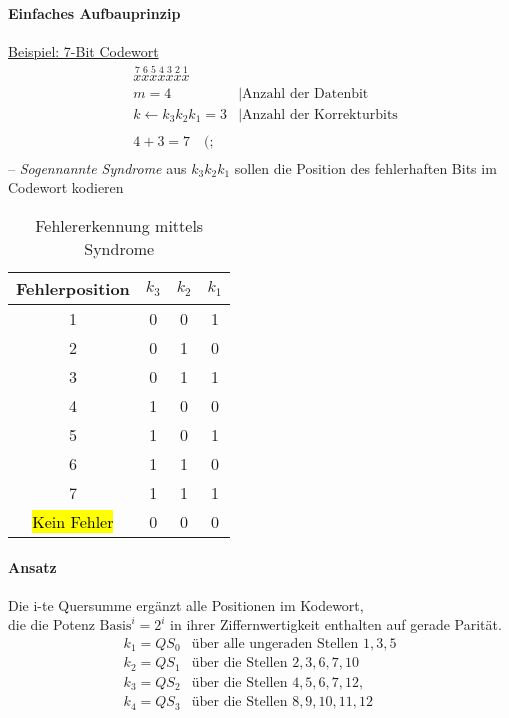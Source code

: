 \documentclass[a4paper]{scrartcl}
\begin{document}
					\paragraph{Einfaches Aufbauprinzip}
					\ul{Beispiel: 7-Bit Codewort}  \\
					 \begin{align*}
					 	 &\overset{7}{x} \overset{6}{x} \overset{5}{x} \overset{4}{x} \overset{3}{x} \overset{2}{x} \overset{1}{x}\\
					 	&m = 4 &| \text{Anzahl der Datenbit}\\
					 	&k \gets k_3 k_2 k_1 = 3 &| \text{Anzahl der Korrekturbits} \\
					 	\\
					 	&4 + 3 = 7 \quad (;\\
					 \end{align*}
					 -- \emph{Sogennannte Syndrome} aus \( k_3 k_2 k_1 \) sollen die Position des fehlerhaften Bits im Codewort kodieren\\ 
					
					\begin{table}[H]
						\centering
						\begin{tabular}{c | c c c }
							Fehlerposition	&\(k_3\) &\(k_2\) & \(k_1\) \\ \hline
							1& 0 & 0 &1\\
							2 &0&1&0\\
							3 &0&1&1\\
							4 &1&0&0\\
							5 &1&0&1\\
							6 &1&1&0\\
							7 &1&1&1\\
							\hl{Kein Fehler}&0&0&0
						\end{tabular}
						\caption{Fehlererkennung mittels Syndrome}
					\end{table}
					
					\paragraph{Ansatz}
						Die i-te Quersumme ergänzt alle Positionen im Kodewort,\\
						die die Potenz \(\text{Basis}^i = 2^i  \) in ihrer Ziffernwertigkeit enthalten auf gerade Parität.\\
						\begin{align*}
							k_1 = QS_0 &\text{über alle ungeraden Stellen } 1,3,5 \\
							k_2 = QS_1 &\text{über die Stellen } 2,3,6,7, 10 \\
							k_3 = QS_2 &\text{über die Stellen } 4, 5, 6, 7, 12,  \\
							k_4 = QS_3 &\text{über die Stellen } 8, 9, 10, 11, 12 \\
						\end{align*}
						
\end{document}

